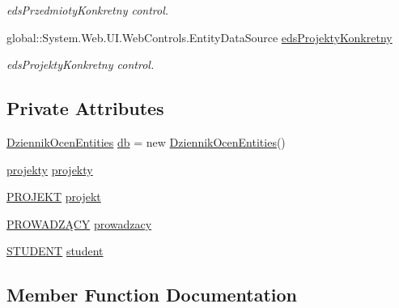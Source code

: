 \begin{DoxyCompactItemize}
\begin{DoxyCompactList}\small\item\em eds\+Przedmioty\+Konkretny control. \end{DoxyCompactList}\item 
global\+::\+System.\+Web.\+U\+I.\+Web\+Controls.\+Entity\+Data\+Source \hyperlink{class_dziennik_ocen_web2_1_1_web_form1_a6a1fedb3c8893198f5063d95b0996840}{eds\+Projekty\+Konkretny}
\begin{DoxyCompactList}\small\item\em eds\+Projekty\+Konkretny control. \end{DoxyCompactList}\end{DoxyCompactItemize}
\subsection*{Private Attributes}
\begin{DoxyCompactItemize}
\item 
\hyperlink{class_dziennik_ocen_web2_1_1_dziennik_ocen_entities}{Dziennik\+Ocen\+Entities} \hyperlink{class_dziennik_ocen_web2_1_1_web_form1_a8247555bffb3698fe1d03a15b2253840}{db} = new \hyperlink{class_dziennik_ocen_web2_1_1_dziennik_ocen_entities}{Dziennik\+Ocen\+Entities}()
\item 
\hyperlink{class_dziennik_ocen_web2_1_1projekty}{projekty} \hyperlink{class_dziennik_ocen_web2_1_1_web_form1_a74f7f160ce70c171580e9b402519ef0c}{projekty}
\item 
\hyperlink{class_dziennik_ocen_web2_1_1_p_r_o_j_e_k_t}{P\+R\+O\+J\+E\+KT} \hyperlink{class_dziennik_ocen_web2_1_1_web_form1_a562d751bd052452a169239c1445f196c}{projekt}
\item 
\hyperlink{class_dziennik_ocen_web2_1_1_p_r_o_w_a_d_z_xC4_x84_c_y}{P\+R\+O\+W\+A\+D\+ZĄ\+CY} \hyperlink{class_dziennik_ocen_web2_1_1_web_form1_a85d951a7def4f525c11c98d11725712d}{prowadzacy}
\item 
\hyperlink{class_dziennik_ocen_web2_1_1_s_t_u_d_e_n_t}{S\+T\+U\+D\+E\+NT} \hyperlink{class_dziennik_ocen_web2_1_1_web_form1_a91ac405a6d3e3a700685501c6ea67fb0}{student}
\end{DoxyCompactItemize}


\subsection{Member Function Documentation}
\mbox{\label{class_dziennik_ocen_web2_1_1_web_form1_a42c9efde3f2521e876ec3e9ab6217b4f}} 
